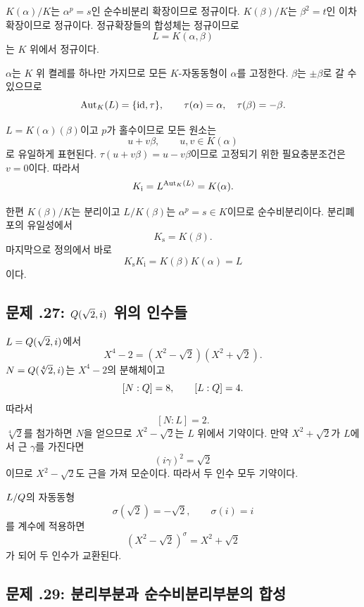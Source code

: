 \begin{solution}
$K(\alpha)/K$는 $\alpha^p=s$인 순수비분리 확장이므로 정규이다. $K(\beta)/K$는 $\beta^2=t$인 이차확장이므로 정규이다. 정규확장들의 합성체는 정규이므로
\[
  L=K(\alpha,\beta)
\]
는 $K$ 위에서 정규이다.

$\alpha$는 $K$ 위 켤레를 하나만 가지므로 모든 $K$-자동동형이 $\alpha$를 고정한다. $\beta$는 $\pm\beta$로 갈 수 있으므로
\[
  \operatorname{Aut}_K(L)=\{\operatorname{id},\tau\},
  \qquad
  \tau(\alpha)=\alpha,\quad \tau(\beta)=-\beta.
\]

$L=K(\alpha)(\beta)$이고 $p$가 홀수이므로 모든 원소는
\[
  u+v\beta,\qquad u,v\in K(\alpha)
\]
로 유일하게 표현된다. $\tau(u+v\beta)=u-v\beta$이므로 고정되기 위한 필요충분조건은 $v=0$이다. 따라서
\[
  K_{\mathrm i}=L^{\operatorname{Aut}_K(L)}=K(\alpha).
\]

한편 $K(\beta)/K$는 분리이고 $L/K(\beta)$는 $\alpha^p=s\in K$이므로 순수비분리이다. 분리폐포의 유일성에서
\[
  K_{\mathrm s}=K(\beta).
\]
마지막으로 정의에서 바로
\[
  K_{\mathrm s}K_{\mathrm i}
  =K(\beta)K(\alpha)=L
\]
이다.
\end{solution}

\subsection*{문제 \thechapter.27: $Q(\sqrt2,i)$ 위의 인수들}

\begin{solution}
$L=Q(\sqrt2,i)$에서
\[
  X^4-2=(X^2-\sqrt2)(X^2+\sqrt2).
\]
$N=Q(\sqrt[4]{2},i)$는 $X^4-2$의 분해체이고
\[
  [N:Q]=8,
  \qquad
  [L:Q]=4.
\]
따라서
\[
  [N:L]=2.
\]
$\sqrt[4]{2}$를 첨가하면 $N$을 얻으므로 $X^2-\sqrt2$는 $L$ 위에서 기약이다. 만약 $X^2+\sqrt2$가 $L$에서 근 $\gamma$를 가진다면
\[
  (i\gamma)^2=\sqrt2
\]
이므로 $X^2-\sqrt2$도 근을 가져 모순이다. 따라서 두 인수 모두 기약이다.

$L/Q$의 자동동형
\[
  \sigma(\sqrt2)=-\sqrt2,
  \qquad
  \sigma(i)=i
\]
를 계수에 적용하면
\[
  (X^2-\sqrt2)^\sigma=X^2+\sqrt2
\]
가 되어 두 인수가 교환된다.
\end{solution}

\subsection*{문제 \thechapter.29: 분리부분과 순수비분리부분의 합성}

